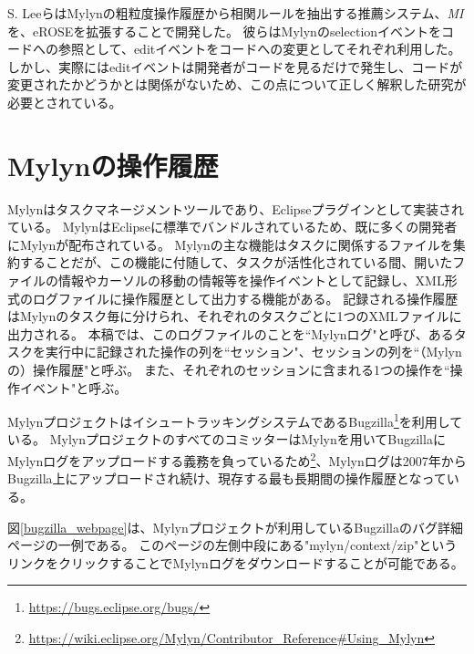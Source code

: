 \documentclass[a4paper]{jsbook}
\begin{document}
S. Leeら\cite{SLee:2015}はMylynの粗粒度操作履歴から相関ルールを抽出する推薦システム、{\it MI}を、eROSE\cite{Zimmermann:2005}を拡張することで開発した。
彼らはMylynのselectionイベントをコードへの参照として、editイベントをコードへの変更としてそれぞれ利用した。
しかし、実際にはeditイベントは開発者がコードを見るだけで発生し、コードが変更されたかどうかとは関係がないため、この点について正しく解釈した研究が必要とされている。

\chapter{Mylynの操作履歴}\label{mylyn_chap}
Mylyn\cite{Kersten:2005}はタスクマネージメントツールであり、Eclipseプラグインとして実装されている。
MylynはEclipseに標準でバンドルされているため、既に多くの開発者にMylynが配布されている。
Mylynの主な機能はタスクに関係するファイルを集約することだが、この機能に付随して、タスクが活性化されている間、開いたファイルの情報やカーソルの移動の情報等を操作イベントとして記録し、XML形式のログファイルに操作履歴として出力する機能がある。
記録される操作履歴はMylynのタスク毎に分けられ、それぞれのタスクごとに1つのXMLファイルに出力される。
本稿では、このログファイルのことを``Mylynログ"と呼び、あるタスクを実行中に記録された操作の列を``セッション"、セッションの列を``（Mylynの）操作履歴"と呼ぶ。
また、それぞれのセッションに含まれる1つの操作を``操作イベント"と呼ぶ。

MylynプロジェクトはイシュートラッキングシステムであるBugzilla\footnote{\url{https://bugs.eclipse.org/bugs/}}を利用している。
MylynプロジェクトのすべてのコミッターはMylynを用いてBugzillaにMylynログをアップロードする義務を負っているため\footnote{\url{https://wiki.eclipse.org/Mylyn/Contributor_Reference\#Using_Mylyn}}、Mylynログは2007年からBugzilla上にアップロードされ続け、現存する最も長期間の操作履歴となっている。

図\ref{bugzilla_webpage}は、Mylynプロジェクトが利用しているBugzillaのバグ詳細ページの一例である。
このページの左側中段にある"mylyn/context/zip"というリンクをクリックすることでMylynログをダウンロードすることが可能である。
\end{document}
